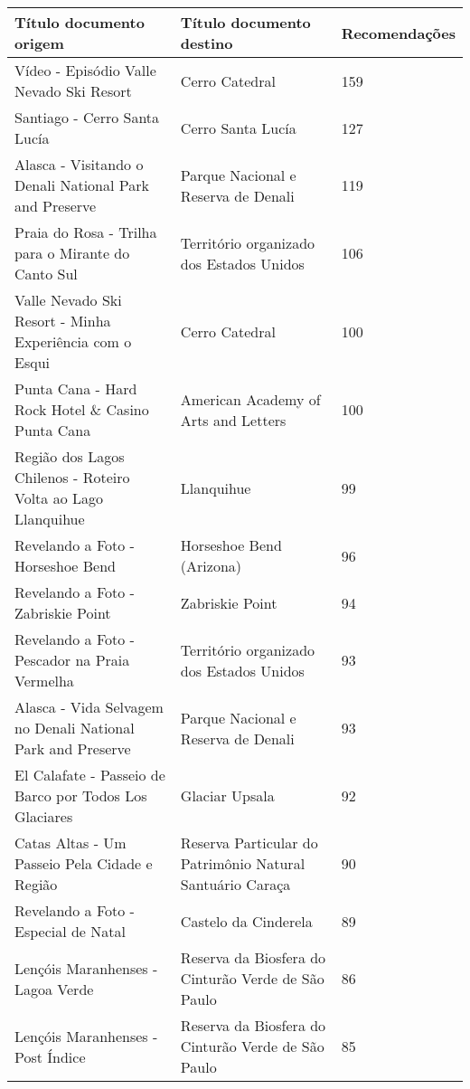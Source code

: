 \begin{center}
    \begin{tabular}{ | m{15em} | m{15em} | m{8em} |}
        \hline
        \textbf{Título documento origem} & \textbf{Título documento destino} & \textbf{Recomendações} \\
        \hline
        Vídeo - Episódio Valle Nevado Ski Resort & Cerro Catedral & 159 \\
        \hline
        Santiago - Cerro Santa Lucía & Cerro Santa Lucía & 127 \\
        \hline
        Alasca - Visitando o Denali National Park and Preserve & Parque Nacional e Reserva de Denali & 119 \\
        \hline
        Praia do Rosa - Trilha para o Mirante do Canto Sul & Território organizado dos Estados Unidos & 106 \\
        \hline
        Valle Nevado Ski Resort - Minha Experiência com o Esqui & Cerro Catedral & 100 \\
        \hline
        Punta Cana - Hard Rock Hotel \& Casino Punta Cana & American Academy of Arts and Letters & 100 \\
        \hline
        Região dos Lagos Chilenos - Roteiro Volta ao Lago Llanquihue & Llanquihue & 99 \\
        \hline
        Revelando a Foto - Horseshoe Bend & Horseshoe Bend (Arizona) & 96 \\
        \hline
        Revelando a Foto - Zabriskie Point & Zabriskie Point & 94 \\
        \hline
        Revelando a Foto - Pescador na Praia Vermelha & Território organizado dos Estados Unidos & 93 \\
        \hline
        Alasca - Vida Selvagem no Denali National Park and Preserve & Parque Nacional e Reserva de Denali & 93 \\
        \hline
        El Calafate - Passeio de Barco por Todos Los Glaciares & Glaciar Upsala & 92 \\
        \hline
        Catas Altas - Um Passeio Pela Cidade e Região & Reserva Particular do Patrimônio Natural Santuário Caraça & 90 \\
        \hline
        Revelando a Foto - Especial de Natal & Castelo da Cinderela & 89 \\
        \hline
        Lençóis Maranhenses - Lagoa Verde & Reserva da Biosfera do Cinturão Verde de São Paulo & 86 \\
        \hline
        Lençóis Maranhenses - Post Índice & Reserva da Biosfera do Cinturão Verde de São Paulo & 85 \\

\end{tabular}
\end{center}
